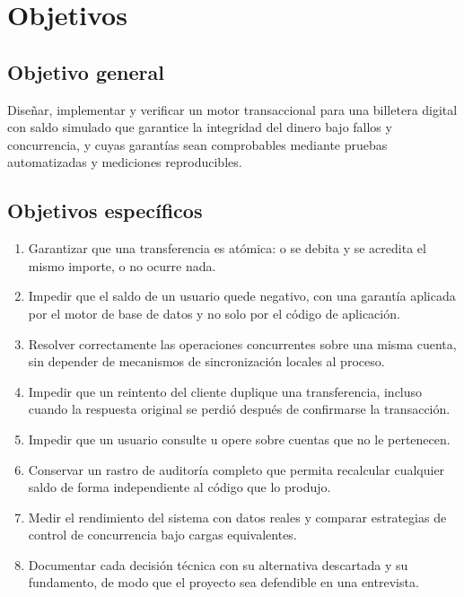 \section{Objetivos}

\subsection{Objetivo general}

Diseñar, implementar y verificar un motor transaccional para una billetera
digital con saldo simulado que garantice la integridad del dinero bajo fallos
y concurrencia, y cuyas garantías sean comprobables mediante pruebas
automatizadas y mediciones reproducibles.

\subsection{Objetivos específicos}

\begin{enumerate}[leftmargin=1.6em,label=\textbf{O\arabic*.}]
  \item Garantizar que una transferencia es atómica: o se debita y se acredita
    el mismo importe, o no ocurre nada.
  \item Impedir que el saldo de un usuario quede negativo, con una garantía
    aplicada por el motor de base de datos y no solo por el código de
    aplicación.
  \item Resolver correctamente las operaciones concurrentes sobre una misma
    cuenta, sin depender de mecanismos de sincronización locales al proceso.
  \item Impedir que un reintento del cliente duplique una transferencia,
    incluso cuando la respuesta original se perdió después de confirmarse la
    transacción.
  \item Impedir que un usuario consulte u opere sobre cuentas que no le
    pertenecen.
  \item Conservar un rastro de auditoría completo que permita recalcular
    cualquier saldo de forma independiente al código que lo produjo.
  \item Medir el rendimiento del sistema con datos reales y comparar
    estrategias de control de concurrencia bajo cargas equivalentes.
  \item Documentar cada decisión técnica con su alternativa descartada y su
    fundamento, de modo que el proyecto sea defendible en una entrevista.
\end{enumerate}

